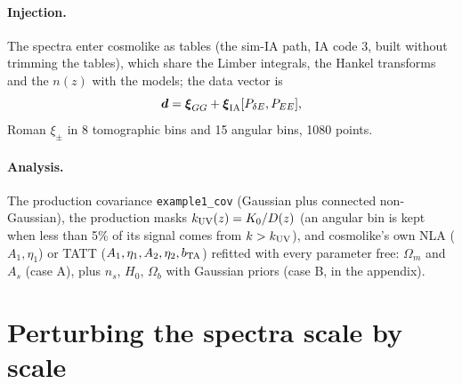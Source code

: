\documentclass[11pt]{article}
\newcommand{\kuv}{k_{\rm UV}}
\newcommand{\PdE}{P_{\delta E}}
\newcommand{\PEE}{P_{EE}}
\newcommand{\bvec}[1]{\boldsymbol{#1}}
\begin{document}
\paragraph{Injection.}
The spectra enter cosmolike as tables (the sim-IA path, IA code 3, built
without trimming the tables), which share the Limber integrals, the
Hankel transforms and the $n(z)$ with the models; the data vector is
\begin{equation}
  \bvec d = \bvec\xi_{GG} + \bvec\xi_{\rm IA}[\PdE, \PEE],
\end{equation}
Roman $\xi_\pm$ in 8 tomographic bins and 15 angular bins, 1080 points.

\paragraph{Analysis.}
The production covariance \texttt{example1\_cov} (Gaussian plus connected
non-Gaussian), the production masks $\kuv(z) = K_0/D(z)$ (an angular bin is
kept when less than 5\% of its signal comes from $k > \kuv$), and cosmolike's
own NLA ($A_1, \eta_1$) or TATT ($A_1, \eta_1, A_2, \eta_2, b_{\rm TA}$)
refitted with every parameter free: $\Omega_m$ and $A_s$ (case A), plus
$n_s$, $H_0$, $\Omega_b$ with Gaussian priors (case B, in the appendix).

\section{Perturbing the spectra scale by scale}
\label{sec:basis}
\end{document}
